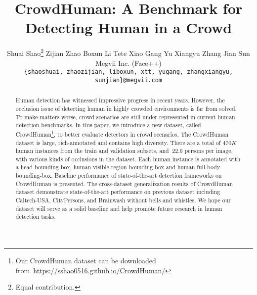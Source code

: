 \documentclass[10pt,twocolumn,letterpaper]{article}
\begin{document}
\title{CrowdHuman: A Benchmark for Detecting Human in a Crowd} 


\author{
    Shuai Shao\thanks{Equal contribution.}
    \hspace{10pt}
    Zijian Zhao\footnotemark[1]
    \hspace{10pt}
    Boxun Li
    \hspace{10pt}
    Tete Xiao
    \hspace{10pt}
    Gang Yu
    \hspace{10pt}
    Xiangyu Zhang
    \hspace{10pt}
    Jian Sun\\
    Megvii Inc. (Face++)\\
{\tt\small \{shaoshuai, zhaozijian, liboxun, xtt, yugang, zhangxiangyu, sunjian\}@megvii.com}
}

\maketitle

\begin{abstract}
Human detection has witnessed impressive progress in recent years. However, the occlusion issue of detecting human in highly crowded environments is far from solved. To make matters worse, crowd scenarios are still under-represented in current human detection benchmarks. In this paper, we introduce a new dataset, called CrowdHuman\footnote{Our CrowdHuman dataset can be downloaded from~\url{https://sshao0516.github.io/CrowdHuman/}}, to better evaluate detectors in crowd scenarios. The CrowdHuman dataset is large, rich-annotated and contains high diversity. There are a total of $470K$ human instances from the train and validation subsets, and $~22.6$ persons per image, with various kinds of occlusions in the dataset. Each human instance is annotated with a head bounding-box, human visible-region bounding-box and human full-body bounding-box. Baseline performance of state-of-the-art detection frameworks on CrowdHuman is presented. The cross-dataset generalization results of CrowdHuman dataset demonstrate state-of-the-art performance on previous dataset including Caltech-USA, CityPersons, and Brainwash without bells and whistles. We hope our dataset will serve as a solid baseline and help promote future research in human detection tasks.
\end{abstract}
\end{document}
